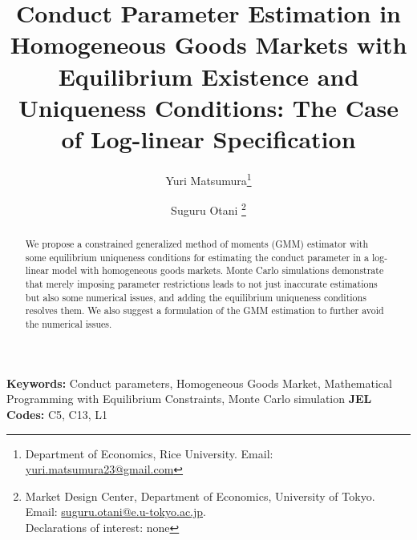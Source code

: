\documentclass[11pt, a4paper]{article}
\title{Conduct Parameter Estimation in Homogeneous Goods Markets with Equilibrium Existence and Uniqueness Conditions: The Case of Log-linear Specification}
\author{Yuri Matsumura\thanks{Department of Economics, Rice University. Email: \href{mailto:}{yuri.matsumura23@gmail.com}} \and Suguru Otani \thanks{Market Design Center, Department of Economics, University of Tokyo. Email: \href{mailto:}{suguru.otani@e.u-tokyo.ac.jp}.
\\Declarations of interest: none %
}}
\theoremstyle{remark}
\begin{document}
\maketitle
\begin{abstract}
    We propose a constrained generalized method of moments (GMM) estimator with some equilibrium uniqueness conditions for estimating the conduct parameter in a log-linear model with homogeneous goods markets.
    Monte Carlo simulations demonstrate that merely imposing parameter restrictions leads to not just inaccurate estimations but also some numerical issues, and adding the equilibrium uniqueness conditions resolves them.
    We also suggest a formulation of the GMM estimation to further avoid the numerical issues.
\end{abstract}

\noindent\textbf{Keywords:} Conduct parameters, Homogeneous Goods Market, Mathematical Programming with Equilibrium Constraints, Monte Carlo simulation
\vspace{0in}
\newline
\noindent\textbf{JEL Codes:} C5, C13, L1

\bigskip

\newpage
\end{document}
